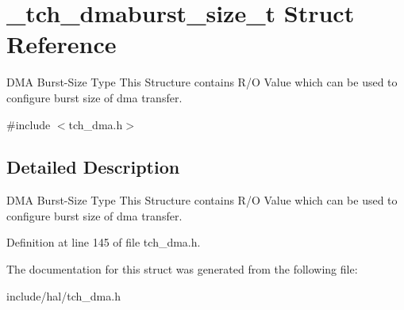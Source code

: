 \hypertarget{struct__tch__dmaburst__size__t}{\section{\+\_\+tch\+\_\+dmaburst\+\_\+size\+\_\+t Struct Reference}
\label{struct__tch__dmaburst__size__t}
}


D\+M\+A Burst-\/\+Size Type This Structure contains R/\+O Value which can be used to configure burst size of dma transfer.  




{\ttfamily \#include $<$tch\+\_\+dma.\+h$>$}



\subsection{Detailed Description}
D\+M\+A Burst-\/\+Size Type This Structure contains R/\+O Value which can be used to configure burst size of dma transfer. 

Definition at line 145 of file tch\+\_\+dma.\+h.



The documentation for this struct was generated from the following file\+:\begin{DoxyCompactItemize}
\item 
include/hal/tch\+\_\+dma.\+h\end{DoxyCompactItemize}
